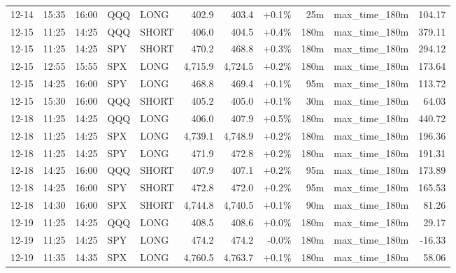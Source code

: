 \documentclass[11pt,a4paper,twoside]{article}
\begin{document}
\begin{center}
\begin{longtable}{>{\color{txtmain}}l l l l l r r r r >{\color{txtmain}}l r}
12-14 & 15:35 & 16:00 & QQQ & LONG & 402.9 & 403.4 & \textcolor{wingreen}{+0.1\%} & 25m & max\_time\_180m & \textcolor{wingreen}{104.17} \\
12-15 & 11:25 & 14:25 & QQQ & SHORT & 406.0 & 404.5 & \textcolor{wingreen}{+0.4\%} & 180m & max\_time\_180m & \textcolor{wingreen}{379.11} \\
12-15 & 11:25 & 14:25 & SPY & SHORT & 470.2 & 468.8 & \textcolor{wingreen}{+0.3\%} & 180m & max\_time\_180m & \textcolor{wingreen}{294.12} \\
12-15 & 12:55 & 15:55 & SPX & LONG & 4,715.9 & 4,724.5 & \textcolor{wingreen}{+0.2\%} & 180m & max\_time\_180m & \textcolor{wingreen}{173.64} \\
12-15 & 14:25 & 16:00 & SPY & LONG & 468.8 & 469.4 & \textcolor{wingreen}{+0.1\%} & 95m & max\_time\_180m & \textcolor{wingreen}{113.72} \\
12-15 & 15:30 & 16:00 & QQQ & SHORT & 405.2 & 405.0 & \textcolor{wingreen}{+0.1\%} & 30m & max\_time\_180m & \textcolor{wingreen}{64.03} \\
12-18 & 11:25 & 14:25 & QQQ & LONG & 406.0 & 407.9 & \textcolor{wingreen}{+0.5\%} & 180m & max\_time\_180m & \textcolor{wingreen}{440.72} \\
12-18 & 11:25 & 14:25 & SPX & LONG & 4,739.1 & 4,748.9 & \textcolor{wingreen}{+0.2\%} & 180m & max\_time\_180m & \textcolor{wingreen}{196.36} \\
12-18 & 11:25 & 14:25 & SPY & LONG & 471.9 & 472.8 & \textcolor{wingreen}{+0.2\%} & 180m & max\_time\_180m & \textcolor{wingreen}{191.31} \\
12-18 & 14:25 & 16:00 & QQQ & SHORT & 407.9 & 407.1 & \textcolor{wingreen}{+0.2\%} & 95m & max\_time\_180m & \textcolor{wingreen}{173.89} \\
12-18 & 14:25 & 16:00 & SPY & SHORT & 472.8 & 472.0 & \textcolor{wingreen}{+0.2\%} & 95m & max\_time\_180m & \textcolor{wingreen}{165.53} \\
12-18 & 14:30 & 16:00 & SPX & SHORT & 4,744.8 & 4,740.5 & \textcolor{wingreen}{+0.1\%} & 90m & max\_time\_180m & \textcolor{wingreen}{81.26} \\
12-19 & 11:25 & 14:25 & QQQ & LONG & 408.5 & 408.6 & \textcolor{wingreen}{+0.0\%} & 180m & max\_time\_180m & \textcolor{wingreen}{29.17} \\
12-19 & 11:25 & 14:25 & SPY & LONG & 474.2 & 474.2 & \textcolor{lossred}{-0.0\%} & 180m & max\_time\_180m & \textcolor{lossred}{-16.33} \\
12-19 & 11:35 & 14:35 & SPX & LONG & 4,760.5 & 4,763.7 & \textcolor{wingreen}{+0.1\%} & 180m & max\_time\_180m & \textcolor{wingreen}{58.06} \\

\end{longtable}
\end{center}
\end{document}

